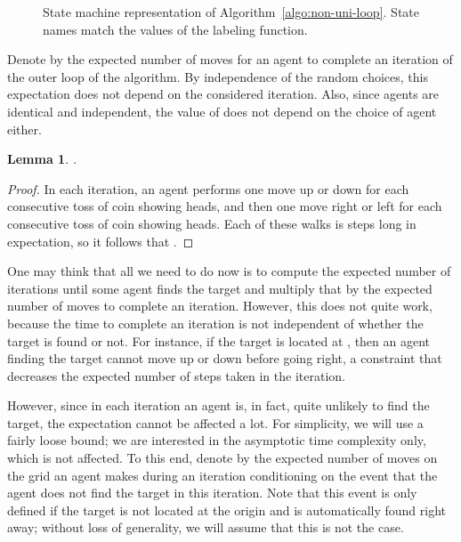 \documentclass[11pt]{article}
\newtheorem{lemma}[theorem]{Lemma}
\begin{document}
\begin{figure}[t]
\begin{minipage}{\textwidth}
\begin{minipage}{.40\textwidth}
\begin{center}
{
}

State machine representation of Algorithm~\ref{algo:non-uni-loop}. State names match the values of the labeling function.

\end{center}
\end{minipage}
%
 \end{minipage}
\end{figure}


Denote by  the expected number of moves for an agent to complete an iteration of the outer loop of the algorithm. By independence of the random choices, this expectation does not depend on the considered iteration. Also, since agents are identical and independent, the value of  does not depend on the choice of agent either.
\begin{lemma}
\label{lem:exp_D}
.
\end{lemma}
\begin{proof}
In each iteration, an agent performs one move up or down for each consecutive toss of coin  showing heads, and then one move right or left for each consecutive toss of coin  showing heads. Each of these walks is  steps long in expectation, so it follows that .
\end{proof}

One may think that all we need to do now is to compute the expected number of iterations until some agent finds the target and multiply that by the expected number of moves to complete an iteration. However, this does not quite work, because the time to complete an iteration is not independent of whether the target is found or not. For instance, if the target is located at , then an agent finding the target cannot move up or down before going right, a constraint that decreases the expected number of steps taken in the iteration. 


However, since in each iteration an agent is, in fact, quite unlikely to find the target, the expectation cannot be affected a lot. For simplicity, we will use a fairly loose bound; we are interested in the asymptotic time complexity only, which is not affected. To this end, denote by  the expected number of moves on the grid an agent makes during an iteration conditioning on the event that the agent does not find the target in this iteration. Note that this event is only defined if the target is not located at the origin  and is automatically found right away; without loss of generality, we will assume that this is not the case.
\end{document}
